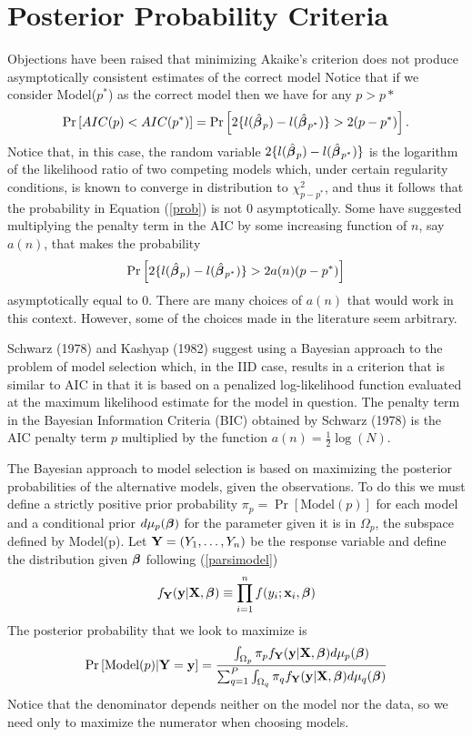 \section{Posterior Probability Criteria}
Objections have been raised that minimizing Akaike's criterion does
not produce asymptotically consistent estimates of the correct model
Notice that if 
we consider Model($p^*$) as the correct model then we have
for any $p>p*$ 
\begin{equation}
\label{prob}
\Pr\left[ AIC(p) < AIC(p^*) \right] = \Pr\left[ 2 \{l(\hat{\mbox{\boldmath $\beta$\unboldmath}\:}\!_{p}) - l(\hat{\mbox{\boldmath $\beta$\unboldmath}\:}\!_{p^*})
\} > 2(p - p^*)\right].
\end{equation}
Notice that, in this case, the random variable $2\{l(\hat{\mbox{\boldmath $\beta$\unboldmath}\:}\!_{p}) -
l(\hat{\mbox{\boldmath $\beta$\unboldmath}\:}\!_{p^*})\}$ is  
the logarithm of the likelihood ratio of two competing models which,
under certain regularity 
conditions, is known to converge in 
distribution to $\chi^2_{p-p^*}$, and thus it follows that the
probability in Equation (\ref{prob}) is not 0
asymptotically.  
Some have suggested multiplying
the penalty term in the 
AIC by some increasing function of $n$, say $a(n)$, that makes the
probability
\[
 \Pr\left[ 2 \{l(\hat{\mbox{\boldmath $\beta$\unboldmath}\:}\!_{p}) - l(\hat{\mbox{\boldmath $\beta$\unboldmath}\:}\!_{p^*})
\} > 2a(n)(p - p^*)\right] 
\]
asymptotically equal to 0. There are many choices of $a(n)$ that would
work in this context. However, some of the choices made in the
literature seem arbitrary.

Schwarz (1978) \nocite{schw:1978} and Kashyap (1982) \nocite{kash:1982} suggest using a
Bayesian approach 
to the problem of model selection which, in the IID case,  results in a 
criterion that is similar to AIC in that it is based on a penalized
log-likelihood function evaluated at the maximum likelihood estimate
for the model in question. The
penalty term in the Bayesian Information Criteria (BIC) obtained by
Schwarz (1978) \nocite{schw:1978} 
is the AIC penalty term $p$ multiplied by the function $a(n)
=\frac{1}{2}\log(N)$.   

The Bayesian approach to model selection is based on maximizing the
posterior probabilities of the alternative models, given the
observations. To do this we must define a strictly positive prior
probability 
$\pi_p = \Pr[\mbox{Model}(p)] $ for each model and a conditional prior
$d\mu_p(\mbox{\boldmath $\beta$\unboldmath})$ for the parameter given it is in $\Omega_p$, the subspace
defined by Model(p). Let ${\mathbf Y} = (Y_1,\dots,Y_n)$ be the
response variable and define the distribution given $\mbox{\boldmath $\beta$\unboldmath}$
following (\ref{parsimodel}) 
\[
f_{{\mathbf Y}}({\mathbf y}| {\mathbf X},\mbox{\boldmath $\beta$\unboldmath}) \equiv \prod_{i=1}^n f(y_i;{\mathbf x}_i,\mbox{\boldmath $\beta$\unboldmath})
\]
The posterior probability that we look to
maximize is  
\[
\Pr\left[\mbox{Model}(p) | {\mathbf Y}={\mathbf y} \right] = 
\frac{\int_{\Omega_p} \pi_p f_{{\mathbf Y}}({\mathbf y}|{\mathbf X},\mbox{\boldmath $\beta$\unboldmath}) d\mu_p(\mbox{\boldmath $\beta$\unboldmath})}
{\sum_{q=1}^P \int_{\Omega_q} \pi_q f_{{\mathbf Y}}({\mathbf y}|{\mathbf X},\mbox{\boldmath $\beta$\unboldmath}) d\mu_q(\mbox{\boldmath $\beta$\unboldmath})}
\]
Notice that the denominator depends neither on the model nor the data,
so we need only to maximize the numerator when choosing models.

